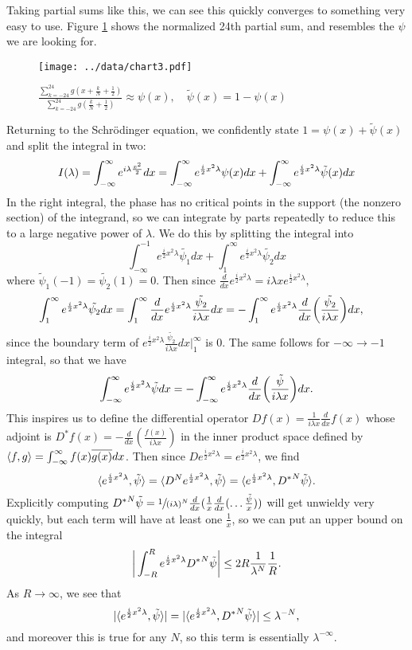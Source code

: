 Taking partial sums like this, we can see this quickly converges to something very easy to use. Figure \ref{fig:pbump24} shows the normalized 24th partial sum, and resembles the $\psi$ we are looking for.
\begin{figure}
	\texttt{[image: ../data/chart3.pdf]}
	\caption{\label{fig:pbump24} $ \frac{\sum_{k=-24}^{24} g(x + \frac{k}{N} + \frac{1}{2})}{\sum_{k=-24}^{24} g(\frac{k}{N} + \frac{1}{2})} \approx \psi(x), \quad \tilde{\psi}(x) = 1 - \psi(x)$}
\end{figure}

Returning to the Schr{\"o}dinger equation, we confidently state $1 = \psi(x) + \tilde{\psi}(x)$ and split the integral in two:
\[
I(\lambda) = \int_{-\infty}^\infty e^{i\lambda\frac{x^2}{2}}dx = \int_{-\infty}^\infty e^{\frac{i}{2}x^2\lambda}\psi(x)dx + \int_{-\infty}^\infty e^{\frac{i}{2}x^2\lambda}\tilde{\psi}(x)dx
\]
In the right integral, the phase has no critical points in the support (the nonzero section) of the integrand, so we can integrate by parts repeatedly to reduce this to a large negative power of $\lambda$. We do this by splitting the integral into
\[
\int_{-\infty}^{-1} e^{\frac{i}{2}x^2\lambda}\tilde{\psi_1}dx + \int_1^\infty e^{\frac{i}{2}x^2\lambda}\tilde{\psi_2}dx
\]
where $\tilde{\psi}_1(-1) = \tilde{\psi_2}(1) =  0$. Then since $\frac{d}{dx} e^{\frac{i}{2}x^2\lambda} = i\lambda xe^{\frac{i}{2}x^2\lambda},$
\begin{align}
\notag \int_1^\infty e^{\frac{i}{2}x^2\lambda}\tilde{\psi_2}dx &= \int_1^\infty \frac{d}{dx} e^{\frac{i}{2}x^2\lambda} \frac{\tilde{\psi_2}}{i\lambda x}dx 
= -\int_1^\infty e^{\frac{i}{2}x^2\lambda}\frac{d}{dx} \bigg(\frac{\tilde{\psi_2}}{i\lambda x}\bigg)dx,
\end{align}
since the boundary term of $e^{\frac{i}{2}x^2\lambda}\frac{\tilde{\psi_2}}{i\lambda x}dx\big|_1^\infty$ is $0$. The same follows for $-\infty \to -1$ integral, so that we have
\[
\int_{-\infty}^\infty e^{\frac{i}{2}x^2\lambda}\tilde{\psi}dx = -\int_{-\infty}^\infty e^{\frac{i}{2}x^2\lambda}\frac{d}{dx}\bigg(\frac{\tilde{\psi}}{i\lambda x}\bigg)dx.
\]
This inspires us to define the differential operator $Df(x) = \frac{1}{i\lambda x}\frac{d}{dx}f(x)$ whose adjoint is $D^*f(x) = -\frac{d}{dx}(\frac{f(x)}{i\lambda x})$ in the inner product space defined by $\langle f, g \rangle = \int_{-\infty}^\infty f(x)\overline{g(x)}dx$. Then since $De^{\frac{i}{2}x^2\lambda} = e^{\frac{i}{2}x^2\lambda}$, we find
\[
\langle e^{\frac{i}{2}x^2\lambda}, \tilde{\psi} \rangle = \langle D^Ne^{\frac{i}{2}x^2\lambda}, \tilde{\psi} \rangle = \langle e^{\frac{i}{2}x^2\lambda}, {D^*}^N\tilde{\psi} \rangle.
\]
Explicitly computing ${D^*}^N\tilde{\psi} = \sfrac{1}{(i\lambda)^N}\frac{d}{dx}(\frac{1}{x}\frac{d}{dx}( \ldots \frac{\tilde{\psi}}{x}))$ will get unwieldy very quickly, but each term will have at least one $\frac{1}{x}$, so we can put an upper bound on the integral
\[
\bigg\lvert\int_{-R}^R e^{\frac{i}{2}x^2\lambda}{D^*}^N\tilde{\psi}\bigg\rvert \leq 2R\frac{1}{\lambda^N}\frac{1}{R}.
\]
As $R \to \infty$, we see that 
\[
\lvert\langle e^{\frac{i}{2}x^2\lambda}, \tilde{\psi} \rangle\rvert = \lvert\langle e^{\frac{i}{2}x^2\lambda}, {D^*}^N\tilde{\psi} \rangle\rvert \leq \lambda^{-N},
\]
and moreover this is true for any $N$, so this term is essentially $\lambda^{-\infty}$.

